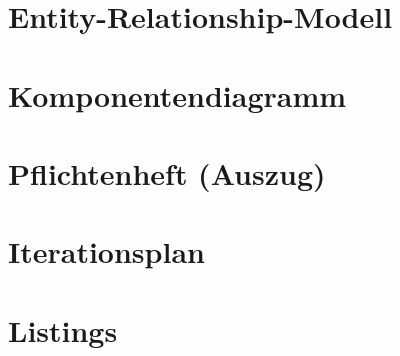 \begin{appendices}
	\section{Entity-Relationship-Modell}
		
		\newpage
		
	\section{Komponentendiagramm}
		
		\newpage
		
	\section{Pflichtenheft (Auszug)}
		
		\newpage
		
	\section{Iterationsplan}
		
		\newpage
		
	\section{Listings}
		
		\newpage
		
\end{appendices}